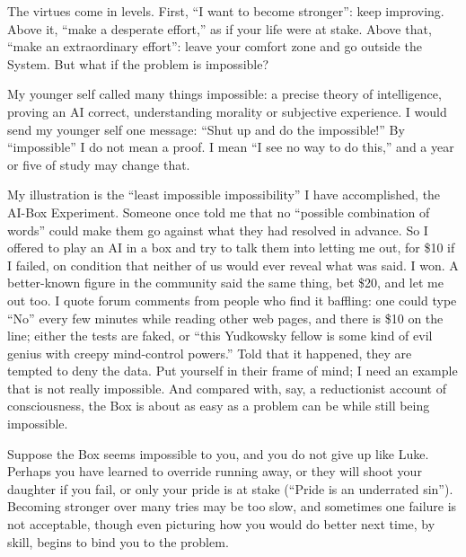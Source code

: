 
The virtues come in levels. First, ``I want to become stronger'': keep improving. Above it, ``make a desperate effort,'' as if your life were at stake. Above that, ``make an extraordinary effort'': leave your comfort zone and go outside the System. But what if the problem is impossible?

My younger self called many things impossible: a precise theory of intelligence, proving an AI correct, understanding morality or subjective experience. I would send my younger self one message: ``Shut up and do the impossible!'' By ``impossible'' I do not mean a proof. I mean ``I see no way to do this,'' and a year or five of study may change that.

My illustration is the ``least impossible impossibility'' I have accomplished, the AI-Box Experiment. Someone once told me that no ``possible combination of words'' could make them go against what they had resolved in advance. So I offered to play an AI in a box and try to talk them into letting me out, for \$10 if I failed, on condition that neither of us would ever reveal what was said. I won. A better-known figure in the community said the same thing, bet \$20, and let me out too.  I quote forum comments from people who find it baffling: one could type ``No'' every few minutes while reading other web pages, and there is \$10 on the line; either the tests are faked, or ``this Yudkowsky fellow is some kind of evil genius with creepy mind-control powers.'' Told that it happened, they are tempted to deny the data. Put yourself in their frame of mind; I need an example that is not really impossible. And compared with, say, a reductionist account of consciousness, the Box is about as easy as a problem can be while still being impossible.

Suppose the Box seems impossible to you, and you do not give up like Luke. Perhaps you have learned to override running away, or they will shoot your daughter if you fail, or only your pride is at stake (``Pride is an underrated sin''). Becoming stronger over many tries may be too slow, and sometimes one failure is not acceptable, though even picturing how you would do better next time, by skill, begins to bind you to the problem.

